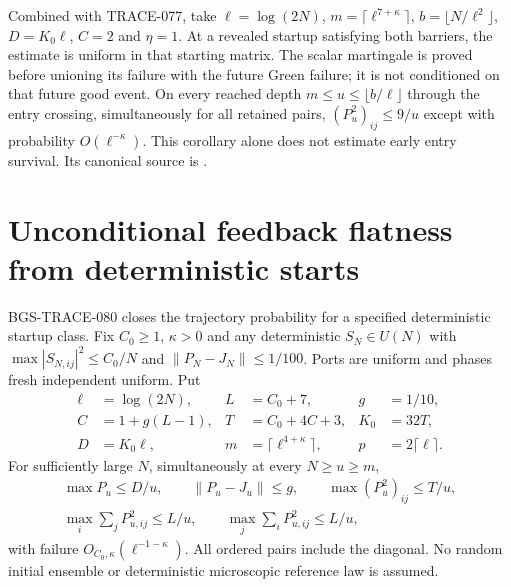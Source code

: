 Combined with TRACE-077, take $\ell=\log(2N)$,
$m=\lceil\ell^{7+\kappa}\rceil$, $b=\lfloor N/\ell^2\rfloor$,
$D=K_0\ell$, $C=2$ and $\eta=1$. At a revealed startup satisfying
both barriers, the estimate is uniform in that starting matrix.
The scalar martingale is proved before unioning its failure with the
future Green failure; it is not conditioned on that future good event.
On every reached depth $m\le u\le\lfloor b/\ell\rfloor$ through the
entry crossing, simultaneously for all retained pairs,
$(P_u^2)_{ij}\le9/u$ except with probability $O(\ell^{-\kappa})$.
This corollary alone does not estimate early entry survival. Its canonical
source is .

\section{Unconditional feedback flatness from deterministic starts}
\label{sec:unconditional-flatness-20261013}

BGS-TRACE-080 closes the trajectory probability for a specified deterministic
startup class. Fix $C_0\ge1$, $\kappa>0$ and any deterministic $S_N\in U(N)$
with $\max|S_{N,ij}|^2\le C_0/N$ and
$\|P_N-J_N\|\le1/100$. Ports are uniform and phases fresh independent
uniform. Put
\[
 \begin{aligned}
 \ell&=\log(2N),& L&=C_0+7,& g&=1/10,\\
 C&=1+g(L-1),& T&=C_0+4C+3,& K_0&=32T,\\
 D&=K_0\ell,& m&=\lceil\ell^{4+\kappa}\rceil,&
 p&=2\lceil\ell\rceil.
 \end{aligned}                                                   \tag{UF.1}
\]
For sufficiently large $N$, simultaneously at every $N\ge u\ge m$,
\[
 \begin{gathered}
 \max P_u\le D/u,\qquad \|P_u-J_u\|\le g,\qquad
 \max(P_u^2)_{ij}\le T/u,\\
 \max_i\sum_jP_{u,ij}^2\le L/u,\qquad
 \max_j\sum_iP_{u,ij}^2\le L/u,
 \end{gathered}                                                   \tag{UF.2}
\]
with failure $O_{C_0,\kappa}(\ell^{-1-\kappa})$. All ordered pairs include
the diagonal. No random initial ensemble or deterministic microscopic
reference law is assumed.

